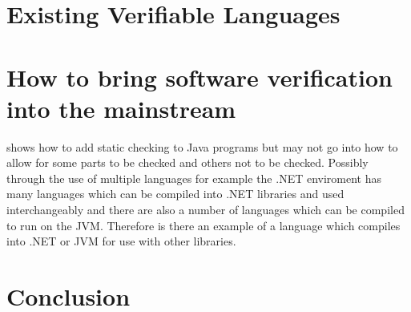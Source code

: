 \documentclass[a4paper,12pt]{scrartcl}
\begin{document}
	\section{Existing Verifiable Languages}
	{
		
	}

	\section{How to bring software verification into the mainstream}
	{
		\cite{Flanagan2002} shows how to add static checking to Java programs but may not go into how to allow for some parts to be checked and others not to be checked. Possibly through the use of multiple languages for example the .NET enviroment has many languages which can be compiled into .NET libraries and used interchangeably and there are also a number of languages which can be compiled to run on the JVM. Therefore is there an example of a language which compiles into .NET or JVM for use with other libraries.
	}
	
	\section{Conclusion}
	{
	
	}
	
	\newpage
	
	\printbibliography[heading=bibintoc,title=References]
\end{document}

